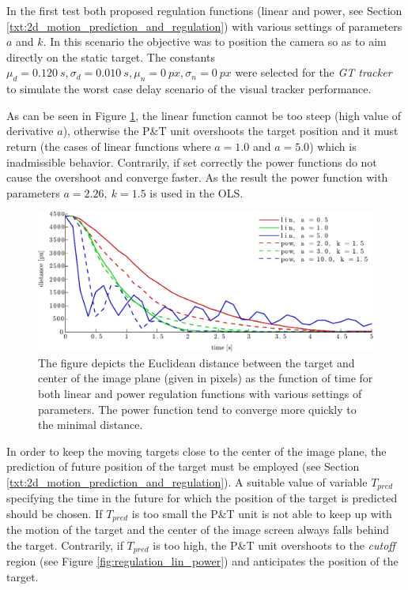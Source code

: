 In the first test both proposed regulation functions (linear and power, see Section \ref{txt:2d_motion_prediction_and_regulation}) with various settings of parameters $a$ and $k$. In this scenario the objective was to position the camera so as to aim directly on the static target. The constants $\mu_{d} = 0.120~s, \sigma_{d} = 0.010~s, \mu_{n} = 0~px, \sigma_{n} = 0~px$ were selected for the \textit{GT tracker} to simulate the worst case delay scenario of the visual tracker performance.

As can be seen in Figure \ref{fig:test_reg_lin_pow}, the linear function cannot be too steep (high value of derivative $a$), otherwise the P\&T unit overshoots the target position and it must return (the cases of linear functions where $a = 1.0$ and $a = 5.0$) which is inadmissible behavior. Contrarily, if set correctly the power functions do not cause the overshoot and converge faster. As the result the power function with parameters $a = 2.26,~k = 1.5$ is used in the OLS.

\begin{figure}[htb]\centering
	\centering
	\includegraphics[width=0.75\linewidth]{fig/test_regulation_lin_pow.pdf}
	\caption{The figure depicts the Euclidean distance between the target and center of the image plane (given in pixels) as the function of time for both linear and power regulation functions with various settings of parameters. The power function tend to converge more quickly to the minimal distance.}
	\label{fig:test_reg_lin_pow}
\end{figure}

In order to keep the moving targets close to the center of the image plane, the prediction of future position of the target must be employed (see Section \ref{txt:2d_motion_prediction_and_regulation}). A suitable value of variable $T_{pred}$ specifying the time in the future for which the position of the target is predicted should be chosen. If $T_{pred}$ is too small the P\&T unit is not able to keep up with the motion of the target and the center of the image screen always falls behind the target. Contrarily, if $T_{pred}$ is too high, the P\&T unit overshoots to the \textit{cutoff} region (see Figure \ref{fig:regulation_lin_power}) and anticipates the position of the target.


